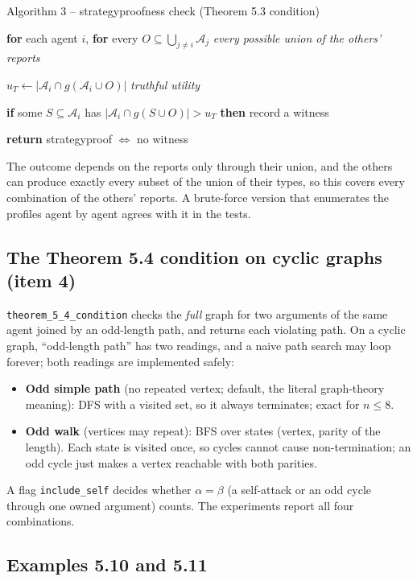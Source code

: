 \documentclass[10pt,a4paper]{article}
\newcommand{\code}[1]{\textcolor{brand!85!black}{\texttt{#1}}}
\newcommand{\kw}[1]{\textsf{\bfseries\color{brand}#1}}
\newcommand{\Args}{\mathcal{A}}
\newcommand{\ind}{\hspace*{1.2em}}
\newcommand{\cmt}[1]{\hfill{\color{muted}\small\itshape #1}}
\begin{document}
\begin{algobox}{Algorithm 3 -- strategyproofness check (Theorem 5.3 condition)}
\begin{algo}
  \item \kw{for} each agent $i$, \kw{for} every $O\subseteq\bigcup_{j\ne i}\Args_j$ \cmt{every possible union of the others' reports}
  \item \ind $u_T\gets|\Args_i\cap g(\Args_i\cup O)|$ \cmt{truthful utility}
  \item \ind \kw{if} some $S\subseteq\Args_i$ has $|\Args_i\cap g(S\cup O)|>u_T$ \kw{then} record a witness
  \item \kw{return} strategyproof $\iff$ no witness
\end{algo}
\end{algobox}

The outcome depends on the reports only through their union, and the others can produce exactly every subset of the union of
their types, so this covers every combination of the others' reports. A brute-force version that enumerates the profiles
agent by agent agrees with it in the tests.

\subsection{The Theorem 5.4 condition on cyclic graphs (item 4)}\label{sec:t54}

\code{theorem\_5\_4\_condition} checks the \emph{full} graph for two arguments of the same agent joined by an odd-length
path, and returns each violating path. On a cyclic graph, ``odd-length path'' has two readings, and a naive path search may
loop forever; both readings are implemented safely:
\begin{itemize}
  \item \textbf{Odd simple path} (no repeated vertex; default, the literal graph-theory meaning): DFS with a visited set, so it
        always terminates; exact for $n\le8$.
  \item \textbf{Odd walk} (vertices may repeat): BFS over states (vertex, parity of the length). Each state is visited once,
        so cycles cannot cause non-termination; an odd cycle just makes a vertex reachable with both parities.
\end{itemize}
A flag \code{include\_self} decides whether $\alpha=\beta$ (a self-attack or an odd cycle through one owned argument) counts.
The experiments report all four combinations.

\subsection{Examples 5.10 and 5.11}\label{sec:ex510}
\end{document}
